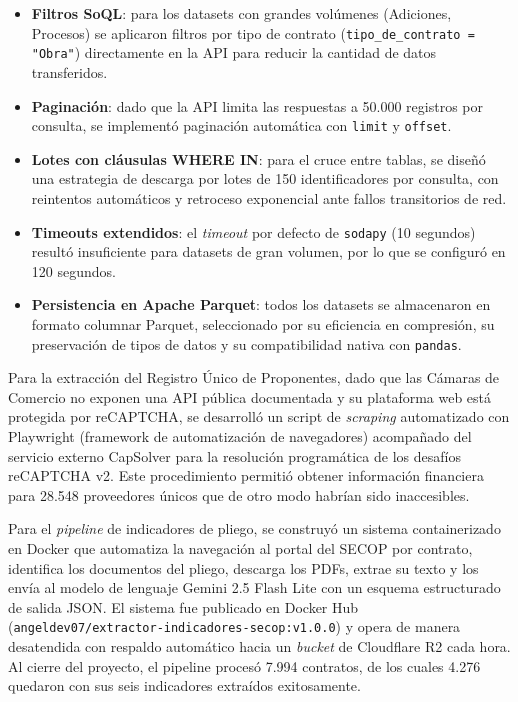 \documentclass[12pt,letterpaper,oneside]{report}
\begin{document}
\begin{itemize}
    \item \textbf{Filtros SoQL}: para los datasets con grandes volúmenes
    (Adiciones, Procesos) se aplicaron filtros por tipo de contrato
    (\texttt{tipo\_de\_contrato = "Obra"}) directamente en la API para reducir la
    cantidad de datos transferidos.
    \item \textbf{Paginación}: dado que la API limita las respuestas a 50.000
    registros por consulta, se implementó paginación automática con
    \texttt{limit} y \texttt{offset}.
    \item \textbf{Lotes con cláusulas WHERE IN}: para el cruce entre tablas, se
    diseñó una estrategia de descarga por lotes de 150 identificadores por
    consulta, con reintentos automáticos y retroceso exponencial ante fallos
    transitorios de red.
    \item \textbf{Timeouts extendidos}: el \emph{timeout} por defecto de
    \texttt{sodapy} (10 segundos) resultó insuficiente para datasets de gran
    volumen, por lo que se configuró en 120 segundos.
    \item \textbf{Persistencia en Apache Parquet}: todos los datasets se
    almacenaron en formato columnar Parquet, seleccionado por su eficiencia en
    compresión, su preservación de tipos de datos y su compatibilidad nativa
    con \texttt{pandas}.
\end{itemize}

Para la extracción del Registro Único de Proponentes, dado que las Cámaras de
Comercio no exponen una API pública documentada y su plataforma web está
protegida por reCAPTCHA, se desarrolló un script de \emph{scraping}
automatizado con Playwright (framework de automatización de navegadores)
acompañado del servicio externo CapSolver para la resolución programática de
los desafíos reCAPTCHA v2. Este procedimiento permitió obtener información
financiera para 28.548 proveedores únicos que de otro modo habrían sido
inaccesibles.

Para el \emph{pipeline} de indicadores de pliego, se construyó un sistema
containerizado en Docker que automatiza la navegación al portal del SECOP por
contrato, identifica los documentos del pliego, descarga los PDFs, extrae su
texto y los envía al modelo de lenguaje Gemini 2.5 Flash Lite con un esquema
estructurado de salida JSON. El sistema fue publicado en Docker Hub
(\texttt{angeldev07/extractor-indicadores-secop:v1.0.0}) y opera de manera
desatendida con respaldo automático hacia un \emph{bucket} de Cloudflare R2
cada hora. Al cierre del proyecto, el pipeline procesó 7.994 contratos, de los
cuales 4.276 quedaron con sus seis indicadores extraídos exitosamente.
\end{document}
